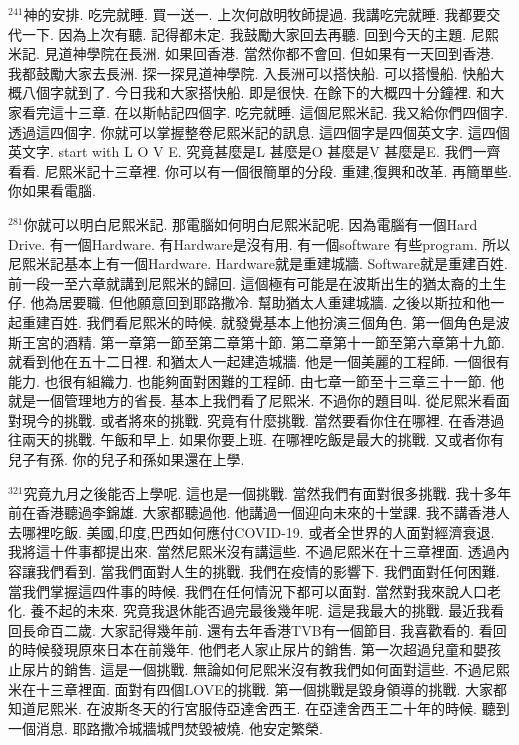 \documentclass{book}
\begin{document}
$^{241}$神的安排.
吃完就睡.
買一送一.
上次何啟明牧師提過.
我講吃完就睡.
我都要交代一下.
因為上次有聽.
記得都未定.
我鼓勵大家回去再聽.
回到今天的主題.
尼熙米記.
見道神學院在長洲.
如果回香港.
當然你都不會回.
但如果有一天回到香港.
我都鼓勵大家去長洲.
探一探見道神學院.
入長洲可以搭快船.
可以搭慢船.
快船大概八個字就到了.
今日我和大家搭快船.
即是很快.
在餘下的大概四十分鐘裡.
和大家看完這十三章.
在以斯帖記四個字.
吃完就睡.
這個尼熙米記.
我又給你們四個字.
透過這四個字.
你就可以掌握整卷尼熙米記的訊息.
這四個字是四個英文字.
這四個英文字.
start with L O V E.
究竟甚麼是L 甚麼是O 甚麼是V 甚麼是E.
我們一齊看看.
尼熙米記十三章裡.
你可以有一個很簡單的分段.
重建,復興和改革.
再簡單些.
你如果看電腦.

$^{281}$你就可以明白尼熙米記.
那電腦如何明白尼熙米記呢.
因為電腦有一個Hard Drive.
有一個Hardware.
有Hardware是沒有用.
有一個software 有些program.
所以尼熙米記基本上有一個Hardware.
Hardware就是重建城牆.
Software就是重建百姓.
前一段一至六章就講到尼熙米的歸回.
這個極有可能是在波斯出生的猶太裔的土生仔.
他為居要職.
但他願意回到耶路撒冷.
幫助猶太人重建城牆.
之後以斯拉和他一起重建百姓.
我們看尼熙米的時候.
就發覺基本上他扮演三個角色.
第一個角色是波斯王宮的酒精.
第一章第一節至第二章第十節.
第二章第十一節至第六章第十九節.
就看到他在五十二日裡.
和猶太人一起建造城牆.
他是一個美麗的工程師.
一個很有能力.
也很有組織力.
也能夠面對困難的工程師.
由七章一節至十三章三十一節.
他就是一個管理地方的省長.
基本上我們看了尼熙米.
不過你的題目叫.
從尼熙米看面對現今的挑戰.
或者將來的挑戰.
究竟有什麼挑戰.
當然要看你住在哪裡.
在香港過往兩天的挑戰.
午飯和早上.
如果你要上班.
在哪裡吃飯是最大的挑戰.
又或者你有兒子有孫.
你的兒子和孫如果還在上學.

$^{321}$究竟九月之後能否上學呢.
這也是一個挑戰.
當然我們有面對很多挑戰.
我十多年前在香港聽過李錦雄.
大家都聽過他.
他講過一個迎向未來的十堂課.
我不講香港人去哪裡吃飯.
美國,印度,巴西如何應付COVID-19.
或者全世界的人面對經濟衰退.
我將這十件事都提出來.
當然尼熙米沒有講這些.
不過尼熙米在十三章裡面.
透過內容讓我們看到.
當我們面對人生的挑戰.
我們在疫情的影響下.
我們面對任何困難.
當我們掌握這四件事的時候.
我們在任何情況下都可以面對.
當然對我來說人口老化.
養不起的未來.
究竟我退休能否過完最後幾年呢.
這是我最大的挑戰.
最近我看回長命百二歲.
大家記得幾年前.
還有去年香港TVB有一個節目.
我喜歡看的.
看回的時候發現原來日本在前幾年.
他們老人家止尿片的銷售.
第一次超過兒童和嬰孩止尿片的銷售.
這是一個挑戰.
無論如何尼熙米沒有教我們如何面對這些.
不過尼熙米在十三章裡面.
面對有四個LOVE的挑戰.
第一個挑戰是毀身領導的挑戰.
大家都知道尼熙米.
在波斯冬天的行宮服侍亞達舍西王.
在亞達舍西王二十年的時候.
聽到一個消息.
耶路撒冷城牆城門焚毀被燒.
他安定繁榮.
\end{document}
